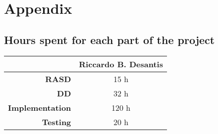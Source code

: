 \documentclass[a4paper,12pt]{book}
\begin{document}
\chapter{Appendix}

\section{Hours spent for each part of the project}
\begin{center}
  \begin{tabular}{ | r | c |}
    \hline
    & \textbf{Riccardo B. Desantis} \\ \hline
    \textbf{RASD} & 15 h \\ \hline
    \textbf{DD} & 32 h \\ \hline
    \textbf{Implementation} & 120 h \\ \hline
    \textbf{Testing} & 20 h \\ \hline
    
  \end{tabular}
\end{center}
\end{document}
